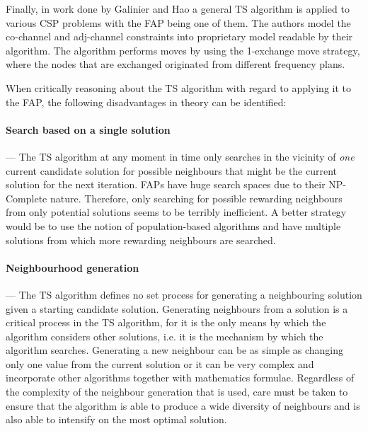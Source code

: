 Finally, in work done by Galinier and Hao\cite{TSCSP} a general TS algorithm is applied to various CSP problems with the FAP being one of them. The authors model the co-channel and adj-channel constraints into proprietary model readable by their algorithm. The algorithm performs moves by using the 1-exchange move strategy, where the nodes that are exchanged originated from different frequency plans\cite{TSCSP}.

When critically reasoning about the \gls{TS} algorithm with regard to applying it to the \gls{FAP}, the following disadvantages in theory can be identified:
\paragraph{Search based on a single solution}
--- The \gls{TS} algorithm at any moment in time only searches in the vicinity of \emph{one} current candidate solution for possible neighbours that might be the current solution for the next iteration. \gls{FAP}s have huge search spaces due to their NP-Complete nature. Therefore, only searching for possible rewarding neighbours from only potential solutions seems to be terribly inefficient. A better strategy would be to use the notion of population-based algorithms and have multiple solutions from which more rewarding neighbours are searched.
\paragraph{Neighbourhood generation}
--- The \gls{TS} algorithm defines no set process for generating a neighbouring solution given a starting candidate solution. Generating neighbours from a solution is a critical process in the \gls{TS} algorithm, for it is the only means by which the algorithm considers other solutions, i.e. it is the mechanism by which the algorithm searches. Generating a new neighbour can be as simple as changing only one value from the current solution or it can be very complex and incorporate other algorithms together with mathematics formulae. Regardless of the complexity of the neighbour generation that is used, care must be taken to ensure that the algorithm is able to produce a wide diversity of neighbours and is also able to intensify on the most optimal solution.
